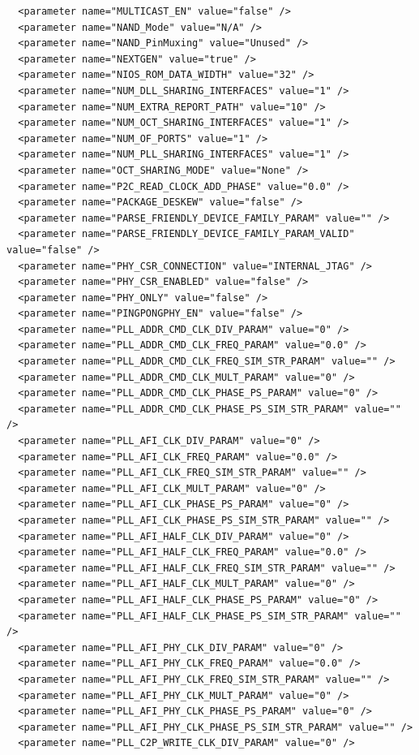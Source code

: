\documentclass[conference]{IEEEtran}
\begin{document}
\begin{lstlisting}
  <parameter name="MULTICAST_EN" value="false" />
  <parameter name="NAND_Mode" value="N/A" />
  <parameter name="NAND_PinMuxing" value="Unused" />
  <parameter name="NEXTGEN" value="true" />
  <parameter name="NIOS_ROM_DATA_WIDTH" value="32" />
  <parameter name="NUM_DLL_SHARING_INTERFACES" value="1" />
  <parameter name="NUM_EXTRA_REPORT_PATH" value="10" />
  <parameter name="NUM_OCT_SHARING_INTERFACES" value="1" />
  <parameter name="NUM_OF_PORTS" value="1" />
  <parameter name="NUM_PLL_SHARING_INTERFACES" value="1" />
  <parameter name="OCT_SHARING_MODE" value="None" />
  <parameter name="P2C_READ_CLOCK_ADD_PHASE" value="0.0" />
  <parameter name="PACKAGE_DESKEW" value="false" />
  <parameter name="PARSE_FRIENDLY_DEVICE_FAMILY_PARAM" value="" />
  <parameter name="PARSE_FRIENDLY_DEVICE_FAMILY_PARAM_VALID" value="false" />
  <parameter name="PHY_CSR_CONNECTION" value="INTERNAL_JTAG" />
  <parameter name="PHY_CSR_ENABLED" value="false" />
  <parameter name="PHY_ONLY" value="false" />
  <parameter name="PINGPONGPHY_EN" value="false" />
  <parameter name="PLL_ADDR_CMD_CLK_DIV_PARAM" value="0" />
  <parameter name="PLL_ADDR_CMD_CLK_FREQ_PARAM" value="0.0" />
  <parameter name="PLL_ADDR_CMD_CLK_FREQ_SIM_STR_PARAM" value="" />
  <parameter name="PLL_ADDR_CMD_CLK_MULT_PARAM" value="0" />
  <parameter name="PLL_ADDR_CMD_CLK_PHASE_PS_PARAM" value="0" />
  <parameter name="PLL_ADDR_CMD_CLK_PHASE_PS_SIM_STR_PARAM" value="" />
  <parameter name="PLL_AFI_CLK_DIV_PARAM" value="0" />
  <parameter name="PLL_AFI_CLK_FREQ_PARAM" value="0.0" />
  <parameter name="PLL_AFI_CLK_FREQ_SIM_STR_PARAM" value="" />
  <parameter name="PLL_AFI_CLK_MULT_PARAM" value="0" />
  <parameter name="PLL_AFI_CLK_PHASE_PS_PARAM" value="0" />
  <parameter name="PLL_AFI_CLK_PHASE_PS_SIM_STR_PARAM" value="" />
  <parameter name="PLL_AFI_HALF_CLK_DIV_PARAM" value="0" />
  <parameter name="PLL_AFI_HALF_CLK_FREQ_PARAM" value="0.0" />
  <parameter name="PLL_AFI_HALF_CLK_FREQ_SIM_STR_PARAM" value="" />
  <parameter name="PLL_AFI_HALF_CLK_MULT_PARAM" value="0" />
  <parameter name="PLL_AFI_HALF_CLK_PHASE_PS_PARAM" value="0" />
  <parameter name="PLL_AFI_HALF_CLK_PHASE_PS_SIM_STR_PARAM" value="" />
  <parameter name="PLL_AFI_PHY_CLK_DIV_PARAM" value="0" />
  <parameter name="PLL_AFI_PHY_CLK_FREQ_PARAM" value="0.0" />
  <parameter name="PLL_AFI_PHY_CLK_FREQ_SIM_STR_PARAM" value="" />
  <parameter name="PLL_AFI_PHY_CLK_MULT_PARAM" value="0" />
  <parameter name="PLL_AFI_PHY_CLK_PHASE_PS_PARAM" value="0" />
  <parameter name="PLL_AFI_PHY_CLK_PHASE_PS_SIM_STR_PARAM" value="" />
  <parameter name="PLL_C2P_WRITE_CLK_DIV_PARAM" value="0" />

\end{lstlisting}
\end{document}
